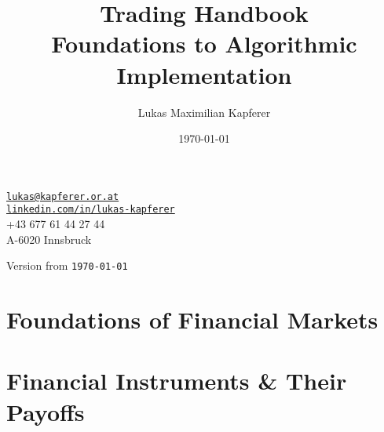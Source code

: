 \documentclass[a4paper, titlepage]{scrbook} %
\title{Trading Handbook\\\large Foundations to Algorithmic Implementation}
\author{Lukas Maximilian Kapferer}
\date{\today}
\begin{document}

\begin{titlepage}
    \centering
    \vspace*{3cm}
    {\LARGE \textbf{\thetitle} \par}
    \vspace{2cm}
    {\large \protect\theauthor\par}
    \vspace{0.5cm}
    \small
    \texttt{\href{mailto:lukas@kapferer.or.at}{lukas@kapferer.or.at}}\\
    \texttt{\href{https://www.linkedin.com/in/lukas-kapferer}{linkedin.com/in/lukas-kapferer}}\\
    +43 677 61 44 27 44\\
    A-6020 Innsbruck \par
    \vspace{0.5cm}
    Version from \texttt{\today}
\end{titlepage}

\tableofcontents
\listoffigures  %
\listoftables   %
\printglossary[type=\acronymtype,title={List of Abbreviations}] %
\printglossary[title={Glossary of Terms}]                       %


\part{Foundations of Financial Markets}\label{part:foundations}






\part{Financial Instruments \& Their Payoffs}\label{part:instruments}





\end{document}
